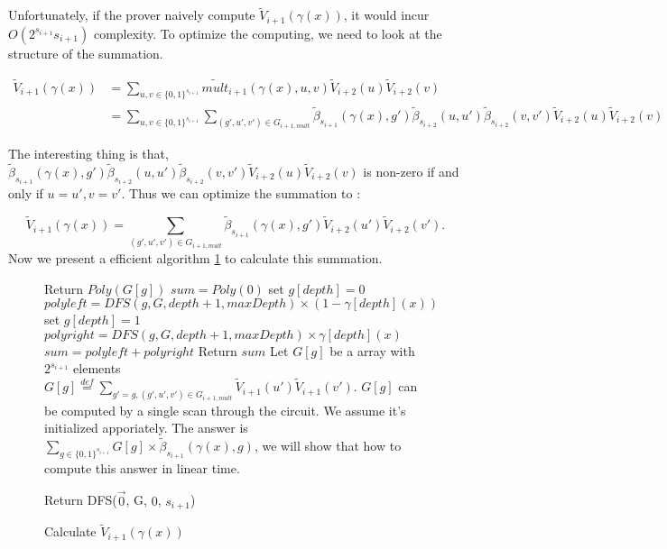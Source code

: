 Unfortunately, if the prover naively compute $\tilde{V}_{i+1}(\gamma(x))$, it would incur $O(2^{s_{i+1}}s_{i+1})$ complexity. To optimize the computing, we need to look at the structure of the summation. 

\begin{align*}
\tilde{V}_{i+1}(\gamma(x))&=\sum_{u, v \in \{0, 1\}^{s_{i+1}}}\tilde{mult}_{i+1}(\gamma(x), u, v)\tilde{V}_{i+2}(u)\tilde{V}_{i+2}(v)\\
&=\sum_{u, v\in \{0, 1\}^{s_{i+1}}}\sum_{(g', u', v') \in G_{i+1, mult}}\tilde{\beta}_{s_{i+1}}(\gamma(x), g')\tilde{\beta}_{s_{i+2}}(u, u')\tilde{\beta}_{s_{i+2}}(v, v')\tilde{V}_{i+2}(u)\tilde{V}_{i+2}(v)
\end{align*}

The interesting thing is that, $\tilde{\beta}_{s_{i+1}}(\gamma(x), g')\tilde{\beta}_{s_{i+2}}(u, u')\tilde{\beta}_{s_{i+2}}(v, v')\tilde{V}_{i+2}(u)\tilde{V}_{i+2}(v)$ is non-zero if and only if $u=u', v=v'$. Thus we can optimize the summation to :

$$\tilde{V}_{i+1}(\gamma(x))=\sum_{(g', u', v') \in G_{i+1, mult}}\tilde{\beta}_{s_{i+1}}(\gamma(x), g')\tilde{V}_{i+2}(u')\tilde{V}_{i+2}(v').$$ Now we present a efficient algorithm \ref{alg::comb} to calculate this summation.

\begin{figure}[p]
\begin{algorithm}[H]
\label{alg::comb}
\caption{Calculate $\tilde{V}_{i+1}(\gamma(x))$}
\begin{algorithmic}[1]
		\State Return $Poly(G[g])$
	\Else
		\State $sum = Poly(0)$
		\State set $g[depth]=0$
		\State $polyleft = DFS(g, G, depth + 1, maxDepth) \times (1-\gamma[depth](x))$
		\State set $g[depth]=1$
		\State $polyright = DFS(g, G, depth + 1, maxDepth) \times \gamma[depth](x)$
		\State $sum = polyleft + polyright$
		\State Return $sum$
	\EndIf
\EndProcedure
{}
\State Let $G[g]$ be a array with $2^{s_{i+1}}$ elements
\State $G[g]\overset{def}{=}\sum_{g'=g, (g', u', v')\in G_{i+1, mult}}\tilde{V}_{i+1}(u')\tilde{V}_{i+1}(v')$.
\State $G[g]$ can be computed by a single scan through the circuit. We assume it's initialized apporiately.
\State The answer is $\sum_{g \in \{0, 1\}^{s_{i+1}}}G[g]\times \tilde{\beta}_{s_{i+1}}(\gamma(x), g)$, we will show that how to compute this answer in linear time.

\State Return {\sf DFS}($\vec{0}$, G, $0$, $s_{i+1}$)
\EndProcedure
\end{algorithmic}
\end{algorithm}
\end{figure}

